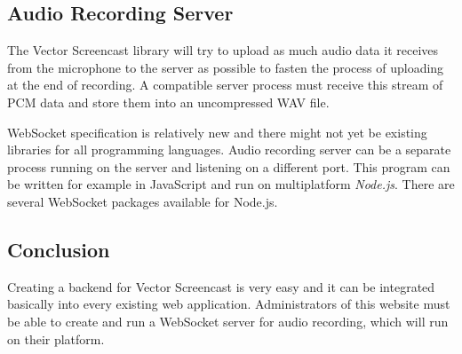 \subsection{Audio Recording Server}
The Vector Screencast library will try to upload as much audio data it receives from the microphone to the server as possible to fasten the process of uploading at the end of recording. A compatible server process must receive this stream of PCM data and store them into an uncompressed WAV file.

WebSocket specification is relatively new and there might not yet be existing libraries for all programming languages. Audio recording server can be a separate process running on the server and listening on a different port. This program can be written for example in JavaScript and run on multiplatform \textit{Node.js}. There are several WebSocket packages available for Node.js.

\subsection{Conclusion}
Creating a backend for Vector Screencast is very easy and it can be integrated basically into every existing web application. Administrators of this website must be able to create and run a WebSocket server for audio recording, which will run on their platform.